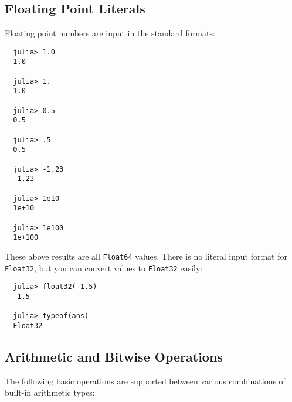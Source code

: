 \documentclass{article}
\begin{document}
\subsection{Floating Point Literals}

Floating point numbers are input in the standard formats:
\begin{verbatim}
  julia> 1.0
  1.0

  julia> 1.
  1.0

  julia> 0.5
  0.5

  julia> .5
  0.5

  julia> -1.23
  -1.23

  julia> 1e10
  1e+10

  julia> 1e100
  1e+100
\end{verbatim}
These above results are all \verb|Float64| values. There is no literal input format for \verb|Float32|, but you can convert values to \verb|Float32| easily:
\begin{verbatim}
  julia> float32(-1.5)
  -1.5

  julia> typeof(ans)
  Float32
\end{verbatim}

\subsection{Arithmetic and Bitwise Operations}

The following basic operations are supported between various combinations of built-in arithmetic types:
\end{document}
